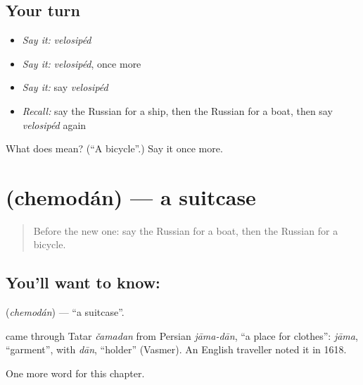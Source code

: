 \subsection*{Your turn}
\begin{itemize}
\raggedright
  \item \emph{Say it:} \emph{velosipéd}
  \item \emph{Say it:} \emph{velosipéd}, once more
  \item \emph{Say it:} say \emph{velosipéd}
  \item \emph{Recall:} say the Russian for a ship, then the Russian for a boat, then say \emph{velosipéd} again
\end{itemize}

\begin{tcolorbox}[breakable,colback=teal!4,colframe=teal!35!black,title={Before you move on}]
What does  mean? (\textquotedblleft{}A bicycle\textquotedblright{}.) Say it once more.
\end{tcolorbox}
\section[\texorpdfstring{\ru{чемодан} (chemodán)}{чемодан (chemodán)}]{ (chemodán) — a suitcase}

\label{lesson:RU-C92-suitcase}



\begin{quote}
Before the new one: say the Russian for a boat, then the Russian for a bicycle.
\end{quote}

\subsection*{You'll want to know: }
\textbf{} (\emph{chemodán}) — \textquotedblleft{}a suitcase\textquotedblright{}.

\begin{cousinweb}
\textbf{} came through Tatar \emph{čamadan} from Persian \emph{jāma-dān}, \textquotedblleft{}a place for clothes\textquotedblright{}: \emph{jāma}, \textquotedblleft{}garment\textquotedblright{}, with \emph{dān}, \textquotedblleft{}holder\textquotedblright{} (Vasmer). An English traveller noted it in 1618.
\end{cousinweb}

\begin{grammarlens}[title={What you've built}]
One more word for this chapter.
\end{grammarlens}

